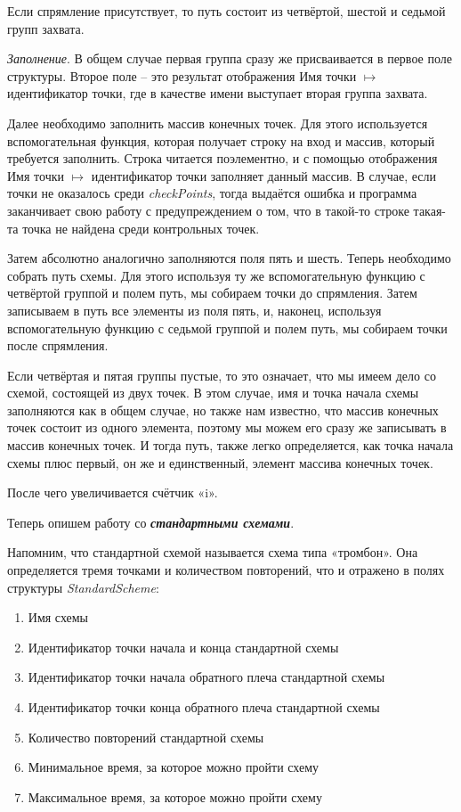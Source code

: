\documentclass[12pt, a4 paper]{article}
\theoremstyle{plain}
\begin{document}
Если спрямление присутствует, то путь состоит из четвёртой, шестой и седьмой групп захвата.

\large\textit{Заполнение}. \normalsize В общем случае первая группа сразу же присваивается в первое поле структуры. Второе поле – это результат отображения Имя точки $\mapsto$ идентификатор точки, где в качестве имени выступает вторая группа захвата.

Далее необходимо заполнить массив конечных точек. Для этого используется вспомогательная функция, которая получает строку на вход и массив, который требуется заполнить. Строка читается поэлементно, и с помощью отображения Имя точки $\mapsto$ идентификатор точки заполняет данный массив. В случае, если точки не оказалось среди \textit{checkPoints}, тогда выдаётся ошибка и программа заканчивает свою работу с предупреждением о том, что в такой-то строке такая-та точка не найдена среди контрольных точек.

Затем абсолютно аналогично заполняются поля пять и шесть. Теперь необходимо собрать путь схемы. Для этого используя ту же вспомогательную функцию с четвёртой группой и полем путь, мы собираем точки до спрямления. Затем записываем в путь все элементы из поля пять, и, наконец, используя вспомогательную функцию с седьмой группой и полем путь, мы собираем точки после спрямления.

Если четвёртая и пятая группы пустые, то это означает, что мы имеем дело со схемой, состоящей из двух точек. В этом случае, имя и точка начала схемы заполняются как в общем случае, но также нам известно, что массив конечных точек состоит из одного элемента, поэтому мы можем его сразу же записывать в массив конечных точек. И тогда путь, также легко определяется, как точка начала схемы плюс первый, он же и единственный, элемент массива конечных точек.

После чего увеличивается счётчик «i».

\bigskip

Теперь опишем работу со \textbf{\textit{стандартными схемами}}.

Напомним, что стандартной схемой называется схема типа «тромбон». Она определяется тремя точками и количеством повторений, что и отражено в полях структуры \textit{StandardScheme}:

\begin{enumerate}
	\item Имя схемы
	\item Идентификатор точки начала и конца стандартной схемы
	\item Идентификатор точки начала обратного плеча стандартной схемы
	\item Идентификатор точки конца обратного плеча стандартной схемы
	\item Количество повторений стандартной схемы
	\item Минимальное время, за которое можно пройти схему
	\item Максимальное время, за которое можно пройти схему
\end{enumerate}
\end{document}
